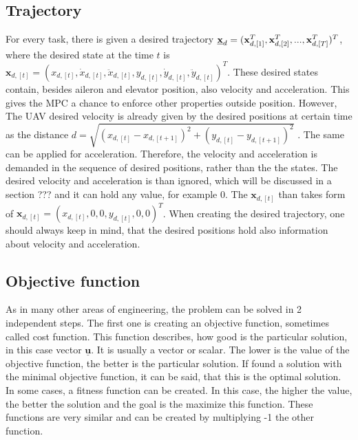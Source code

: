 \documentclass{article}
\begin{document}
\subsection{Trajectory}
For every task, there is given a desired trajectory $\textbf{\underline{x}}_d = 
(\textbf{x}_{d,[1]}^T, \textbf{x}_{d,[2]}^T, ..., \textbf{x}_{d,[T]}^T)^T$, where the desired state at the time $t$ is $\textbf{x}_{d,[t]} = (x_{d,[t]}, \dot{x}_{d,[t]}, \ddot{x}_{d,[t]}, y_{d,[t]}, \dot{y}_{d,[t]}, \ddot{y}_{d,[t]})^T$. These desired states contain, besides aileron and elevator position, also velocity and acceleration. This gives the MPC a chance to  enforce other properties outside position. However, The UAV desired velocity is already given by the desired positions at certain time as the distance $d = \sqrt{(x_{d,[t]}-x_{d,[t+1]})^2+ (y_{d,[t]}- y_{d,[t+1]})^2}$ . The same can be applied for acceleration. Therefore, the velocity and acceleration is demanded in the sequence of desired positions, rather than the the states. The desired velocity and acceleration is than ignored, which will be discussed in a section ??? and it can hold any value, for example 0. The $\textbf{x}_{d,[t]}$ than takes form of $\textbf{x}_{d,[t]} = (x_{d,[t]}, 0, 0, y_{d,[t]}, 0, 0)^T$. When creating the desired trajectory, one should always keep in mind, that the desired positions hold also information about velocity and acceleration. 

\subsection{Objective function}
As in many other areas of engineering, the problem can be solved in 2 independent steps. The first one is creating an objective function, sometimes called cost function. This function describes, how good is the particular solution, in this case vector $\underline{\textbf{u}}$. It is usually a vector or scalar. The lower is the value of the objective function, the better is the particular solution. If found a solution with the minimal objective function, it can be said, that this is the optimal solution. In some cases, a fitness function can be created. In this case, the higher the value, the better the solution and the goal is the maximize this function. These functions are very similar and can be created by multiplying -1 the other function.
\end{document}

